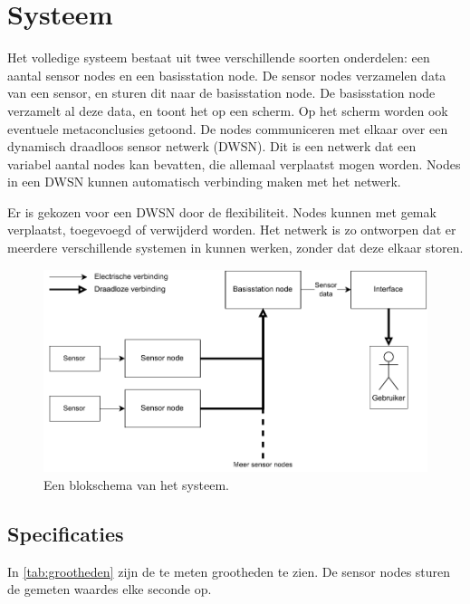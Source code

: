 \section{Systeem}
Het volledige systeem bestaat uit twee verschillende soorten onderdelen: een aantal sensor nodes en een basisstation node.
De sensor nodes verzamelen data van een sensor, en sturen dit naar de basisstation node. De basisstation node verzamelt al deze data, en toont het op een scherm. Op het scherm worden ook eventuele metaconclusies getoond.
De nodes communiceren met elkaar over een dynamisch draadloos sensor netwerk (DWSN).
Dit is een netwerk dat een variabel aantal nodes kan bevatten, die allemaal verplaatst mogen worden. Nodes in een DWSN kunnen automatisch verbinding maken met het netwerk.

Er is gekozen voor een DWSN door de flexibiliteit. Nodes kunnen met gemak verplaatst, toegevoegd of verwijderd worden. Het netwerk is zo ontworpen dat er meerdere verschillende systemen in kunnen werken, zonder dat deze  elkaar storen.

\begin{figure}[ht]
    \centering
    \includegraphics{img/fullsystem.pdf}
    \caption{Een blokschema van het systeem.}
    \label{fig:fullsystem}
\end{figure}

\subsection{Specificaties}

In \autoref{tab:grootheden} zijn de te meten grootheden te zien.
De sensor nodes sturen de gemeten waardes elke seconde op. 

